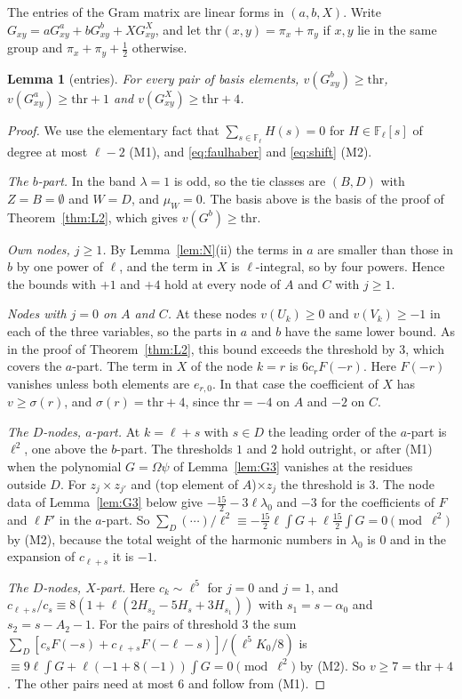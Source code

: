 \documentclass[11pt]{amsart}
\newtheorem{lemma}[theorem]{Lemma}
\theoremstyle{definition}
\theoremstyle{remark}
\numberwithin{equation}{section}
\newcommand{\F}{\mathbb F}
\begin{document}
The entries of the Gram matrix are linear forms in $(a,b,X)$. Write $G_{xy}=aG^a_{xy}+bG^b_{xy}+XG^X_{xy}$, and
let $\mathrm{thr}(x,y)=\pi_x+\pi_y$ if $x,y$ lie in the same group and $\pi_x+\pi_y+\frac12$ otherwise.

\begin{lemma}[entries]\label{lem:entries}
For every pair of basis elements, $v(G^b_{xy})\ge\mathrm{thr}$, $v(G^a_{xy})\ge\mathrm{thr}+1$ and $v(G^X_{xy})\ge\mathrm{thr}+4$.
\end{lemma}

\begin{proof}
We use the elementary fact that $\sum_{s\in\F_\ell}H(s)=0$ for $H\in\F_\ell[s]$ of degree at most $\ell-2$ (M1), and
\eqref{eq:faulhaber} and \eqref{eq:shift} (M2).

\emph{The $b$-part.} In the band $\lambda=1$ is odd, so the tie classes are $(B,D)$ with $Z=B=\emptyset$ and $W=D$, and
$\mu_W=0$. The basis above is the basis of the proof of Theorem~\ref{thm:L2}, which gives $v(G^b)\ge\mathrm{thr}$.

\emph{Own nodes, $j\ge1$.} By Lemma~\ref{lem:N}(ii) the terms in $a$ are smaller than those in $b$ by one power of
$\ell$, and the term in $X$ is $\ell$-integral, so by four powers. Hence the bounds with $+1$ and $+4$ hold at every node of $A$ and
$C$ with $j\ge1$.

\emph{Nodes with $j=0$ on $A$ and $C$.} At these nodes $v(U_k)\ge0$ and $v(V_k)\ge-1$ in each of the three
variables, so the parts in $a$ and $b$ have the same lower bound. As in the proof of Theorem~\ref{thm:L2}, this
bound exceeds the threshold by $3$, which covers the $a$-part. The term in $X$ of the node $k=r$ is $6c_rF(-r)$. Here
$F(-r)$ vanishes unless both elements are $e_{r,0}$. In that case the coefficient of $X$ has $v\ge\sigma(r)$, and
$\sigma(r)=\mathrm{thr}+4$, since $\mathrm{thr}=-4$ on $A$ and $-2$ on $C$.

\emph{The $D$-nodes, $a$-part.} At $k=\ell+s$ with $s\in D$ the leading order of the $a$-part is $\ell^2$, one above the $b$-part. The
thresholds $1$ and $2$ hold outright, or after (M1) when the polynomial $G=\Omega\psi$ of Lemma~\ref{lem:G3} vanishes at the
residues outside $D$. For $z_j\times z_{j'}$ and (top element of $A$)$\times z_j$ the threshold is $3$. The node data of
Lemma~\ref{lem:G3} below give $-\frac{15}2-3\ell\lambda_0$ and $-3$ for the coefficients of
$F$ and $\ell F'$ in the $a$-part. So $\sum_D(\cdots)/\ell^2\equiv-\frac{15}2\ell\int G+\ell\frac{15}2\int G=0\pmod{\ell^2}$ by (M2), because the total weight of the harmonic numbers in
$\lambda_0$ is $0$ and in the expansion of $c_{\ell+s}$ it is $-1$.

\emph{The $D$-nodes, $X$-part.} Here $c_k\sim\ell^5$ for $j=0$ and $j=1$, and $c_{\ell+s}/c_s\equiv8(1+\ell(2H_{s_2}-5H_s+3H_{s_1}))$
with $s_1=s-\alpha_0$ and $s_2=s-A_2-1$. For the pairs of threshold $3$ the sum
$\sum_D[c_sF(-s)+c_{\ell+s}F(-\ell-s)]/(\ell^5K_0/8)$ is $\equiv9\ell\int G+\ell(-1+8(-1))\int G=0\pmod{\ell^2}$ by (M2). So $v\ge7=\mathrm{thr}+4$. The other pairs need at most $6$ and follow from (M1).
\end{proof}
\end{document}
